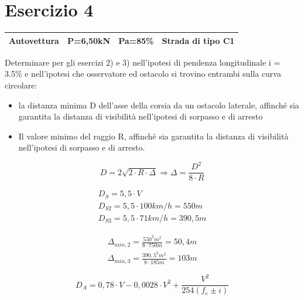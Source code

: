 \documentclass[
a4paper,
12pt, 
twoside]{scrbook}
\begin{document}
{{{{{{{{   \section{Esercizio 4}
   {
   	\centering
   	\begin{tabular}{|c|c|c|c|}
   		\hline
   		\rule[-1ex]{0pt}{2.5ex}  Autovettura & P=6,50kN & Pa=85\% & Strada di tipo C1 \\
   		\hline
   	\end{tabular}\par
   }
   \leavevmode\newline
   \begin{boxK}
   	Determinare per gli esercizi 2) e 3) nell'ipotesi di pendenza longitudinale i = 3.5\% e nell'ipotesi che osservatore ed ostacolo si trovino entrambi sulla curva circolare: 
   	\begin{itemize}
   	 \item la distanza minima D dell’asse della corsia da un ostacolo laterale, affinché sia garantita la distanza di visibilità nell’ipotesi di sorpasso e di arresto
   	 \item Il valore minimo del raggio R, affinché sia garantita la distanza di visibilità nell’ipotesi di sorpasso e di arresto. 
   	\end{itemize} 
   \end{boxK} 
   
   \begin{equation}
   	D=2\sqrt{2\cdot R\cdot \Delta}\Rightarrow \Delta=\frac{D^2}{8\cdot R}
   \end{equation} 	
   
   \begin{equation}
   	\begin{aligned}
   		D_S=5,5\cdot V\phantom{..............}\\
   		D_{S2}=5,5\cdot 100km/h=550m\\
   		D_{S3}=5,5\cdot 71km/h=390,5m
   	\end{aligned} 	
   \end{equation}
  
   \begin{equation}
   	\begin{aligned}
   		\Delta_{min,2}=\frac{550^2m^2}{8\cdot 750m}=50,4m\\
   		\Delta_{min,3}=\frac{390,5^2m^2}{8\cdot 185m}=103m
   	\end{aligned} 	
   \end{equation}
   
   \begin{equation}
   	D_A=0,78\cdot V-0,0028\cdot V^2+\frac{V^2}{254(f_e\pm i)}
   \end{equation} 	
   
}}}}}}}}
\end{document}

